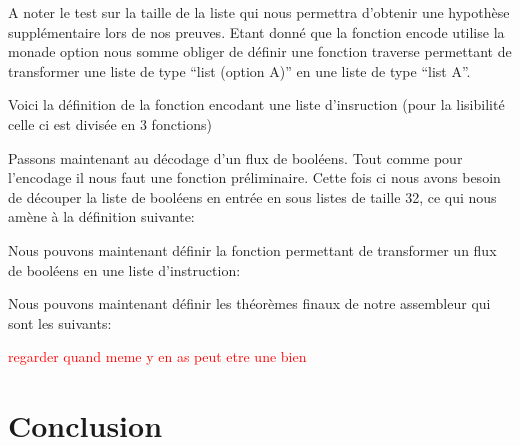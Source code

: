 \documentclass {article}
\newcommand{\codefrom}[3]
           {}
\theoremstyle{definition}
\theoremstyle{remark}
\newcommand{\todo}[1]{\textcolor{red}{#1}}
\begin{document}
\codefrom{src}{encode}{concat_listes_32}

A noter le test sur la taille de la liste
qui nous permettra d'obtenir une hypothèse supplémentaire lors de nos preuves.
Etant donné que la fonction encode utilise la monade option nous somme obliger de définir une fonction
traverse permettant de transformer une liste de type ``list (option A)'' en une liste de type ``list A''.

\codefrom{src}{encode}{traverse}

Voici la définition de la fonction encodant une liste d'insruction (pour la lisibilité celle ci est
divisée en 3 fonctions)

\codefrom{src}{encode}{encode_flux}

Passons maintenant au décodage d'un flux de booléens. Tout comme pour l'encodage il nous faut
une fonction préliminaire. Cette fois ci nous avons besoin de découper la liste de booléens
en entrée en sous listes de taille 32, ce qui nous amène à la définition suivante:

\codefrom{src}{encode}{cut_32}

Nous pouvons maintenant définir la fonction permettant de transformer un flux de booléens
en une liste d'instruction:

\codefrom{src}{encode}{decode_flux}



Nous pouvons maintenant définir les théorèmes finaux de notre assembleur qui sont les suivants:

\codefrom{src}{encode}{encode_decode_flux_decoup}

\codefrom{src}{encode}{decode_flux_decoup_encode}

\todo{regarder quand meme y en as peut etre une bien}






\section{Conclusion}
\end{document}
